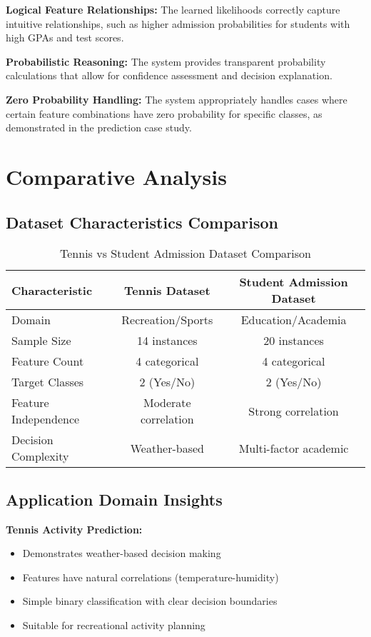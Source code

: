 \documentclass[11pt,a4paper]{article}
\begin{document}
\textbf{Logical Feature Relationships:} The learned likelihoods correctly capture intuitive relationships, such as higher admission probabilities for students with high GPAs and test scores.

\textbf{Probabilistic Reasoning:} The system provides transparent probability calculations that allow for confidence assessment and decision explanation.

\textbf{Zero Probability Handling:} The system appropriately handles cases where certain feature combinations have zero probability for specific classes, as demonstrated in the prediction case study.

\section{Comparative Analysis}

\subsection{Dataset Characteristics Comparison}

\begin{table}[H]
\centering
\caption{Tennis vs Student Admission Dataset Comparison}
\begin{tabular}{|l|c|c|}
\hline
\textbf{Characteristic} & \textbf{Tennis Dataset} & \textbf{Student Admission Dataset} \\
\hline
Domain & Recreation/Sports & Education/Academia \\
Sample Size & 14 instances & 20 instances \\
Feature Count & 4 categorical & 4 categorical \\
Target Classes & 2 (Yes/No) & 2 (Yes/No) \\
Feature Independence & Moderate correlation & Strong correlation \\
Decision Complexity & Weather-based & Multi-factor academic \\
\hline
\end{tabular}
\end{table}

\subsection{Application Domain Insights}

\textbf{Tennis Activity Prediction:}
\begin{itemize}
    \item Demonstrates weather-based decision making
    \item Features have natural correlations (temperature-humidity)
    \item Simple binary classification with clear decision boundaries
    \item Suitable for recreational activity planning
\end{itemize}
\end{document}

